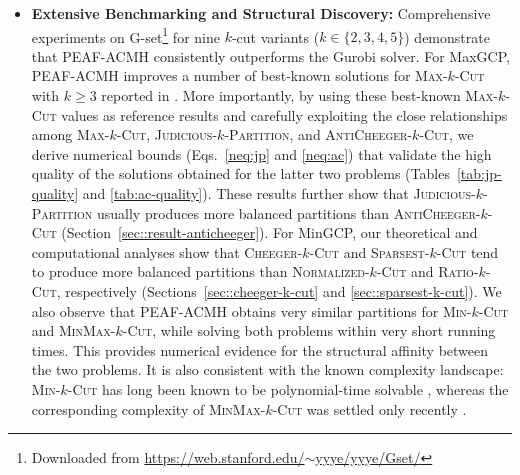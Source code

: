 \documentclass[12pt, a4paper]{article}%
\numberwithin{equation}{section}
\theoremstyle{plain}
\begin{document}
\begin{itemize}
\item \textbf{Extensive Benchmarking and Structural Discovery:}
        Comprehensive experiments on G-set\footnote{Downloaded from \href{https://web.stanford.edu/~yyye/yyye/Gset/}{https://web.stanford.edu/$\sim$yyye/yyye/Gset/}} for nine $k$-cut variants 
($k \in \{2,3,4,5\}$) demonstrate that PEAF-ACMH consistently outperforms the
Gurobi solver. For MaxGCP, PEAF-ACMH improves a number of best-known
solutions for \textsc{Max}-$k$-\textsc{Cut} with $k \ge 3$ reported in
\cite{Ma2015}. More importantly, by using these best-known
\textsc{Max}-$k$-\textsc{Cut} values as reference results and carefully exploiting
the close relationships among \textsc{Max}-$k$-\textsc{Cut},
\textsc{Judicious}-$k$-\textsc{Partition}, and
\textsc{AntiCheeger}-$k$-\textsc{Cut}, we derive numerical bounds
(Eqs.~\eqref{neq:jp} and \eqref{neq:ac}) that validate the high quality of the
solutions obtained for the latter two problems
(Tables~\ref{tab:jp-quality} and \ref{tab:ac-quality}). These results further
show that \textsc{Judicious}-$k$-\textsc{Partition} usually produces more
balanced partitions than \textsc{AntiCheeger}-$k$-\textsc{Cut}
(Section~\ref{sec::result-anticheeger}). For MinGCP, our theoretical and computational analyses show that
\textsc{Cheeger}-$k$-\textsc{Cut} and \textsc{Sparsest}-$k$-\textsc{Cut} tend to
produce more balanced partitions than \textsc{Normalized}-$k$-\textsc{Cut} and
\textsc{Ratio}-$k$-\textsc{Cut}, respectively
(Sections~\ref{sec::cheeger-k-cut} and \ref{sec::sparsest-k-cut}). We also
observe that PEAF-ACMH obtains very similar partitions for
\textsc{Min}-$k$-\textsc{Cut} and \textsc{MinMax}-$k$-\textsc{Cut}, while solving
both problems within very short running times. This provides numerical evidence
for the structural affinity between the two problems. It is also consistent with
the known complexity landscape: \textsc{Min}-$k$-\textsc{Cut} has long been known
to be polynomial-time solvable \cite{goldschmidt1994polynomial}, whereas the
corresponding complexity of \textsc{MinMax}-$k$-\textsc{Cut} was settled only
recently \cite{chandrasekaran2023fixed}. 

\end{itemize}
\end{document}
